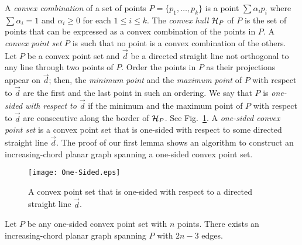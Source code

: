 \documentclass{llncs}
\begin{document}
A {\em convex combination} of a set of points $P=\{p_1,\dots,p_k\}$ is a point $\sum \alpha_i p_i$ where $\sum \alpha_i=1$ and $\alpha_i\geq 0$ for each $1\leq i\leq k$. The {\em convex hull} ${\cal H}_P$ of $P$ is the set of points that can be expressed as a convex combination of the points in $P$. A {\em convex point set} $P$ is such that no point is a convex combination of the others. Let $P$ be a convex point set and $\vec d$ be a directed straight line not orthogonal to any line through two points of $P$. Order the points in $P$ as their projections appear on $\vec d$; then, the {\em minimum point} and the {\em maximum point} of $P$ with respect to $\vec d$ are the first and the last point in such an ordering. We say that $P$ is  {\em one-sided with respect to $\vec d$} if the minimum and the maximum point of $P$ with respect to $\vec d$ are consecutive along the border of ${\cal H}_P$. See Fig.~\ref{fig:one-sided-x}. A {\em one-sided convex point set} is a convex point set that is one-sided with respect to some directed straight line $\vec d$. The proof of our first lemma shows an algorithm to construct an increasing-chord planar graph spanning a one-sided convex point set.


\begin{figure}[tb]
\begin{center}
\mbox{\texttt{[image: One-Sided.eps]}}
\caption{A convex point set that is one-sided with respect to a directed straight line $\vec d$.}
\label{fig:one-sided-x}
\end{center}
\end{figure}


\begin{lemma} \label{lemma:half_convex_planar_graph}
Let $P$ be any one-sided convex point set with $n$ points. There exists an increasing-chord planar graph spanning $P$ with $2n-3$ edges.
\end{lemma}
\end{document}
